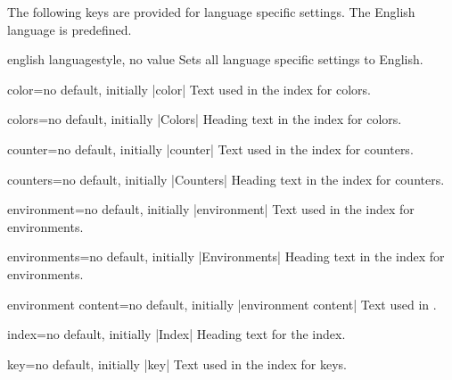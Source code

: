 \clearpage
The following keys are provided for language specific settings.
The English language is predefined.

\begin{docTcbKey}{english language}{}{style, no value}
  Sets all language specific settings to English.
\end{docTcbKey}

\begin{langTcbKey}{color}{=}{no default, initially |color|}
  Text used in the index for colors.
\end{langTcbKey}

\begin{langTcbKey}{colors}{=}{no default, initially |Colors|}
  Heading text in the index for colors.
\end{langTcbKey}

\begin{langTcbKey}[][doc new={2015-01-08}]{counter}{=}{no default, initially |counter|}
  Text used in the index for counters.
\end{langTcbKey}

\begin{langTcbKey}[][doc new={2015-01-08}]{counters}{=}{no default, initially |Counters|}
  Heading text in the index for counters.
\end{langTcbKey}

\begin{langTcbKey}{environment}{=}{no default, initially |environment|}
  Text used in the index for environments.
\end{langTcbKey}

\begin{langTcbKey}{environments}{=}{no default, initially |Environments|}
  Heading text in the index for environments.
\end{langTcbKey}

\begin{langTcbKey}{environment content}{=}{no default, initially |environment content|}
  Text used in .
\end{langTcbKey}

\begin{langTcbKey}{index}{=}{no default, initially |Index|}
  Heading text for the index.
\end{langTcbKey}

\begin{langTcbKey}{key}{=}{no default, initially |key|}
  Text used in the index for keys.
\end{langTcbKey}

